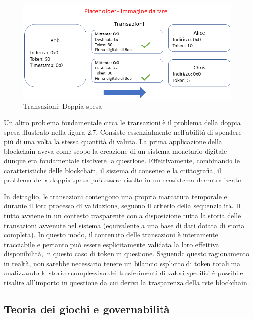 \begin{figure}[H]
\centering
\includegraphics[width=1\textwidth]{immagini/transazioneplaceholder2.png}
\caption{Transazioni: Doppia spesa}
\label{fig:meshtest6x}
\end{figure}

Un altro problema fondamentale circa le transazioni è il problema della doppia spesa illustrato nella figura 2.7. Consiste essenzialmente nell’abilità di spendere più di una volta la stessa quantità di valuta. La prima applicazione della blockchain aveva come scopo la creazione di un sistema monetario digitale dunque era fondamentale risolvere la questione. Effettivamente, combinando le caratteristiche delle blockchain, il sistema di consenso e la crittografia, il problema della doppia spesa può essere risolto in un ecosistema decentralizzato. 

In dettaglio, le transazioni contengono una propria marcatura temporale e durante il loro processo di validazione, seguono il criterio della sequenzialità. Il tutto avviene in un contesto trasparente con a disposizione tutta la storia delle transazioni avvenute nel sistema (equivalente a una base di dati dotata di storia completa). In questo modo, il contenuto delle transazioni è interamente tracciabile e pertanto può essere esplicitamente validata la loro effettiva disponibilità, in questo caso di token in questione. Seguendo questo ragionamento in realtà, non sarebbe necessario tenere un bilancio esplicito di token totali ma analizzando lo storico complessivo dei trasferimenti di valori specifici è possibile risalire all’importo in questione da cui deriva la trasparenza della rete blockchain.

\subsection{Teoria dei giochi e governabilità}

